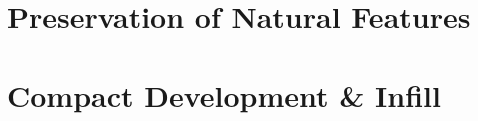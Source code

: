 \documentclass[11pt,fleqn, openany]{book} %
\begin{document}
\chapter{Preservation of Natural Features}
\label{app:pres_natfeatures}

\chapter{Compact Development \& Infill}
\label{app:compact_development}




\cleardoublepage
{}
\setlength{\columnsep}{0.75cm}
\printindex

\end{document}
